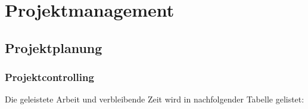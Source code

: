 
\clearpage
{}
\recalctypearea
    \chapter{Projektmanagement}
    \section{Projektplanung}
    \subsection{Projektcontrolling}
    Die geleistete Arbeit und verbleibende Zeit wird in nachfolgender Tabelle gelistet:
    
